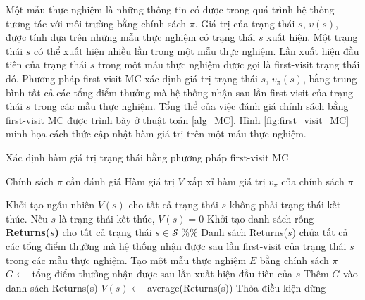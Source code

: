 Một mẫu thực nghiệm là những thông tin có được trong quá trình hệ thống tương tác với môi trường bằng chính sách $\pi$. Giá trị của trạng thái $s$, $v(s)$, được tính dựa trên những mẫu thực nghiệm có trạng thái $s$ xuất hiện. Một trạng thái $s$ có thể xuất hiện nhiều lần trong một mẫu thực nghiệm. Lần xuất hiện đầu tiên của trạng thái $s$ trong một mẫu thực nghiệm được gọi là first-visit trạng thái đó. Phương pháp first-visit MC xác định giá trị trạng thái $s$, $v_{\pi}(s)$, bằng trung bình tất cả các tổng điểm thưởng mà hệ thống nhận sau lần first-visit của trạng thái $s$ trong các mẫu thực nghiệm. Tổng thể của việc đánh giá chính sách bằng first-visit MC được trình bày ở thuật toán \ref{alg_MC}. Hình \ref{fig:first_visit_MC} minh họa cách thức cập nhật hàm giá trị trên một mẫu thực nghiệm.
\begin{algorithm}
	\caption{Xác định hàm giá trị trạng thái bằng phương pháp first-visit MC}
	\label{alg_MC}
	\begin{algorithmic}[1]
		\renewcommand{\algorithmicrequire}{\textbf{Đầu vào:}}
		\renewcommand{\algorithmicensure}{\textbf{Đầu ra:}}
		\algnewcommand{}
		\algnewcommand\Operation{\item[\algorithmicoperation]}
		
		\Require Chính sách $\pi$ cần đánh giá
		\Ensure Hàm giá trị $V$ xấp xỉ hàm giá trị $v_{\pi}$ của chính sách $\pi$
		
		\Operation
		\State Khởi tạo ngẫu nhiên $V(s)$ cho tất cả trạng thái $s$ không phải trạng thái kết thúc. Nếu $s$ là trạng thái kết thúc, $V(s) = 0$
		\State Khởi tạo danh sách rỗng \textbf{Returns($s$)} cho tất cả trạng thái $s \in \mathcal{S}$ \%\% Danh sách Returns($s$) chứa tất cả các tổng điểm thưởng mà hệ thống nhận được sau lần first-visit của trạng thái $s$ trong các mẫu thực nghiệm.
		\Repeat
		\State Tạo một mẫu thực nghiệm $E$ bằng chính sách $\pi$
		\State $G \leftarrow$ tổng điểm thưởng nhận được sau lần xuất hiện đầu tiên của $s$
		\State Thêm $G$ vào danh sách Returns(s)
		\State $V(s) \leftarrow$ average(Returns(s))
		\EndFor
		\Until Thỏa điều kiện dừng
	\end{algorithmic}
\end{algorithm}
